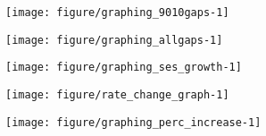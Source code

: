 \documentclass[11pt, a4paper]{article}\usepackage[]{graphicx}\usepackage[]{color}
\begin{document}
{\centering \texttt{[image: figure/graphing\_9010gaps-1]} 

}






{\centering \texttt{[image: figure/graphing\_allgaps-1]} 

}






{\centering \texttt{[image: figure/graphing\_ses\_growth-1]} 

}










{\centering \texttt{[image: figure/rate\_change\_graph-1]} 

}








{\centering \texttt{[image: figure/graphing\_perc\_increase-1]} 

}









\end{document}
